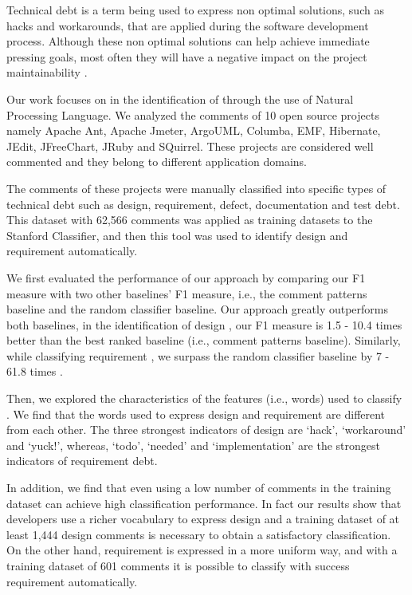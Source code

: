 Technical debt is a term being used to express non optimal solutions, such as hacks and workarounds, that are applied during the software development process. Although these non optimal solutions can help achieve immediate pressing goals, most often they will have a negative impact on the project maintainability . 

Our work focuses on in the identification of \SATD through the use of Natural Processing Language. We analyzed the comments of 10 open source projects namely Apache Ant, Apache Jmeter, ArgoUML, Columba, EMF, Hibernate, JEdit, JFreeChart, JRuby and SQuirrel. These projects are considered well commented and they belong to different application domains.

The comments of these projects were manually classified into specific types of technical debt such as design, requirement, defect, documentation and test debt. This dataset with 62,566 comments was applied as training datasets to the Stanford Classifier, and then this tool was used to identify  design and requirement \SATD automatically.

We first evaluated the performance of our approach by comparing our F1 measure with two other baselines' F1 measure, i.e., the comment patterns baseline and the random classifier baseline. Our approach greatly outperforms both baselines, in the identification of design \SATD, our F1 measure is 1.5 - 10.4  times better than the best ranked baseline (i.e., comment patterns baseline). Similarly, while classifying requirement \SATD, we surpass the random classifier baseline by 7 - 61.8 times  .

Then, we explored the characteristics of the features (i.e., words) used to classify \SATD. We find that the words used to express design and requirement \SATD are different from each other. The three strongest indicators of design \SATD are `hack', `workaround' and `yuck!', whereas, `todo', `needed' and `implementation' are the strongest indicators of requirement debt.
 
In addition, we find that even using a low number of \SATD comments in the training dataset can achieve high classification performance. In fact our results show that developers use a richer vocabulary to express design \SATD and a training dataset of at least 1,444  design \SATD comments is necessary to obtain a satisfactory classification. On the other hand, requirement \SATD is expressed in a more uniform way, and with a training dataset of 601  \SATD comments it is possible to classify with success requirement \SATD automatically.

